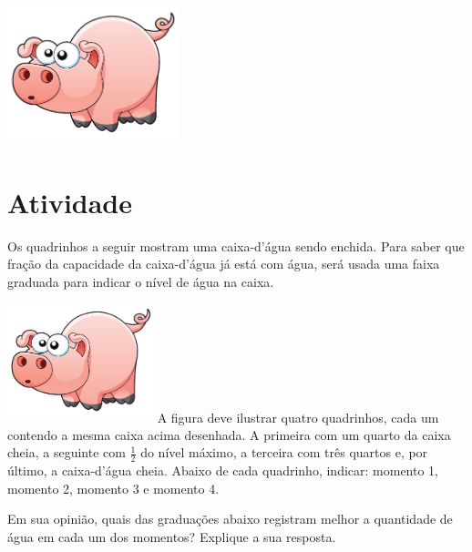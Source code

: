 \documentclass[a4,12pt]{book}
\begin{document}
\includegraphics[width=\textwidth,height=4cm, keepaspectratio]{pig}
\section{Atividade}







Os quadrinhos a seguir mostram uma caixa-d'água sendo enchida.
Para saber que fração da capacidade da caixa-d'água já está com água, será usada uma faixa graduada para indicar o nível de água na caixa.

\begin{imagem*}[breakable]{}{}
    \includegraphics[width=120pt, keepaspectratio]{pig}
  A figura deve ilustrar quatro quadrinhos, cada um contendo a mesma caixa acima desenhada. A primeira com um quarto da caixa cheia, a seguinte com   $\frac{1}{2}$   do nível máximo, a terceira com três quartos e, por último, a caixa-d'água cheia. Abaixo de cada quadrinho, indicar: momento 1, momento 2, momento 3 e momento 4.
\end{imagem*}

Em sua opinião, quais das graduações abaixo registram melhor a quantidade de água em cada um dos momentos? Explique a sua resposta.
\end{document}
